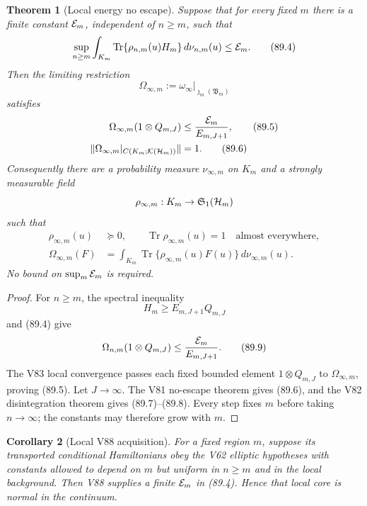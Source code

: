 \documentclass[11pt]{article}
\newtheorem{theorem}{Theorem}[section]
\newtheorem{corollary}[theorem]{Corollary}
\theoremstyle{remark}
\begin{document}
\begin{theorem}[Local energy no escape]
\label{thm:v12v89-local-normal}
Suppose that for every fixed \(m\) there is a finite constant
\({\cal E}_m\), independent of \(n\geq m\), such that
\begin{equation}
 \sup_{n\geq m}\int_{K_m}
 \operatorname{Tr}\{\rho_{n,m}(u)H_m\}\,d\nu_{n,m}(u)
 \leq{\cal E}_m.                                            \tag{89.4}
\end{equation}
Then the limiting restriction
\[
                         \Omega_{\infty,m}
 :=\omega_\infty|_{\jmath_m({\mathfrak B}_m)}
\]
satisfies
\begin{align}
 \Omega_{\infty,m}(1\otimes Q_{m,J})
 &\leq{{\cal E}_m\over E_{m,J+1}},                          \tag{89.5}\\
 \|\Omega_{\infty,m}|_{C(K_m;{\cal K}({\cal H}_m))}\|
 &=1.                                                       \tag{89.6}
\end{align}
Consequently there are a probability measure \(\nu_{\infty,m}\) on
\(K_m\) and a strongly measurable field
\[
 \rho_{\infty,m}:K_m\to{\mathfrak S}_1({\cal H}_m)
\]
such that
\begin{align}
 \rho_{\infty,m}(u)&\succeq0,\qquad
 \operatorname{Tr}\rho_{\infty,m}(u)=1
 \quad\text{almost everywhere},                            \tag{89.7}\\
 \Omega_{\infty,m}(F)
 &=\int_{K_m}\operatorname{Tr}\{
 \rho_{\infty,m}(u)F(u)\}\,d\nu_{\infty,m}(u).              \tag{89.8}
\end{align}
No bound on \(\sup_m{\cal E}_m\) is required.
\end{theorem}

\begin{proof}
For \(n\geq m\), the spectral inequality
\[
                         H_m\geq E_{m,J+1}Q_{m,J}
\]
and (89.4) give
\[
 \Omega_{n,m}(1\otimes Q_{m,J})
 \leq{{\cal E}_m\over E_{m,J+1}}.                           \tag{89.9}
\]
The V83 local convergence passes each fixed bounded element
\(1\otimes Q_{m,J}\) to \(\Omega_{\infty,m}\), proving (89.5).
Let \(J\to\infty\).  The V81 no-escape theorem gives (89.6), and the
V82 disintegration theorem gives (89.7)--(89.8).
Every step fixes \(m\) before taking \(n\to\infty\); the constants
may therefore grow with \(m\).
\end{proof}

\begin{corollary}[Local V88 acquisition]
\label{cor:v12v89-V88}
For a fixed region \(m\), suppose its transported conditional
Hamiltonians obey the V62 elliptic hypotheses with constants allowed
to depend on \(m\) but uniform in \(n\geq m\) and in the local
background.  Then V88 supplies a finite
\({\cal E}_m\) in (89.4).  Hence that local core is normal in the
continuum.
\end{corollary}
\end{document}
